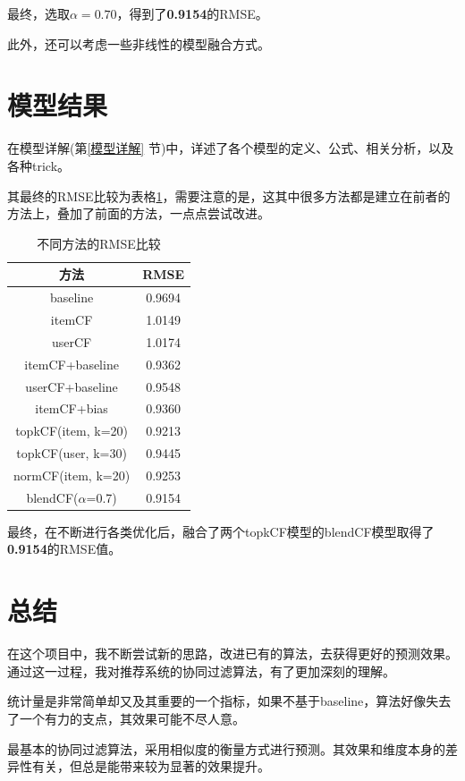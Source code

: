 \documentclass[utf8, a4paper, 11pt, onecolumn]{ctexart}
\begin{document}
\begin{spacing}{1.3}
最终，选取$\alpha = 0.70$，得到了\textbf{0.9154}的RMSE。

此外，还可以考虑一些非线性的模型融合方式。

\section{模型结果}

在模型详解(第\ref{模型详解} 节)中，详述了各个模型的定义、公式、相关分析，以及各种trick。

其最终的RMSE比较为表格\ref{RMSE-table}，需要注意的是，这其中很多方法都是建立在前者的方法上，叠加了前面的方法，一点点尝试改进。

\begin{table}[h]
	\centering
	\begin{tabular}{|c|c|}
		\hline
		\textbf{方法} & \textbf{RMSE} \\
		\hline
		baseline &   0.9694 \\
		\hline
		itemCF &  1.0149 \\
		\hline
		userCF & 1.0174 \\
		\hline
		itemCF+baseline &  0.9362 \\
		\hline
		userCF+baseline & 0.9548 \\
		\hline
		itemCF+bias & 0.9360 \\
		\hline
		topkCF(item, k=20) & 0.9213 \\
		\hline
		topkCF(user, k=30) &0.9445 \\
		\hline
		normCF(item, k=20) &0.9253 \\
		\hline
		blendCF($\alpha$=0.7) & 0.9154 \\		
		\hline
	\end{tabular}
	\caption{不同方法的RMSE比较}
	\label{RMSE-table}
\end{table}

最终，在不断进行各类优化后，融合了两个topkCF模型的blendCF模型取得了\textbf{0.9154}的RMSE值。

\section{总结}

在这个项目中，我不断尝试新的思路，改进已有的算法，去获得更好的预测效果。通过这一过程，我对推荐系统的协同过滤算法，有了更加深刻的理解。

统计量是非常简单却又及其重要的一个指标，如果不基于baseline，算法好像失去了一个有力的支点，其效果可能不尽人意。

最基本的协同过滤算法，采用相似度的衡量方式进行预测。其效果和维度本身的差异性有关，但总是能带来较为显著的效果提升。


\end{spacing}
\end{document}
